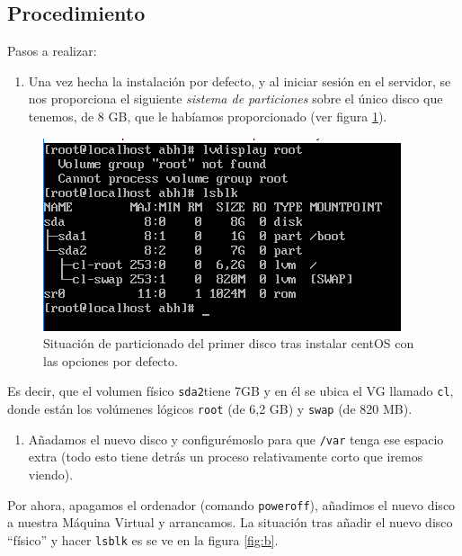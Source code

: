 \documentclass[
]{book}
\providecommand{\tightlist}{%
  \setlength{\itemsep}{0pt}\setlength{\parskip}{0pt}}
\begin{document}
\hypertarget{procedimiento}{%
\subsection{Procedimiento}\label{procedimiento}}

Pasos a realizar:

\begin{enumerate}
\def\labelenumi{\arabic{enumi}.}
\tightlist
\item
  Una vez hecha la instalación por defecto, y al iniciar sesión en el servidor, se nos proporciona el siguiente \emph{sistema de particiones} sobre el único disco que tenemos, de 8 GB, que le habíamos proporcionado (ver figura \ref{fig:a}).
\end{enumerate}

\begin{figure}

{\centering \includegraphics[width=0.6\linewidth]{images/a} 

}

\caption{Situación de particionado del primer disco tras instalar centOS con las opciones por defecto.}\label{fig:a}
\end{figure}

Es decir, que el volumen físico \texttt{sda2}tiene 7GB y en él se ubica el VG llamado \texttt{cl}, donde están los volúmenes lógicos \texttt{root} (de 6,2 GB) y \texttt{swap} (de 820 MB).

\begin{enumerate}
\def\labelenumi{\arabic{enumi}.}
\setcounter{enumi}{1}
\tightlist
\item
  Añadamos el nuevo disco y configurémoslo para que \texttt{/var} tenga ese espacio extra (todo esto tiene detrás un proceso relativamente corto que iremos viendo).
\end{enumerate}

Por ahora, apagamos el ordenador (comando \texttt{poweroff}), añadimos el nuevo disco a nuestra Máquina Virtual y arrancamos. La situación tras añadir el nuevo disco ``físico'' y hacer \texttt{lsblk} es se ve en la figura \ref{fig:b}.
\end{document}
